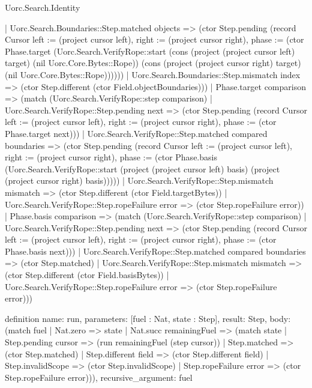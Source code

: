 \begin{lexlean}{Uorc.Search.Identity}
\begin{semanticmodule}
{      | Uorc.Search.Boundaries::Step.matched objects => (ctor Step.pending (record Cursor {left := (project cursor left), right := (project cursor right), phase := (ctor Phase.target (Uorc.Search.VerifyRope::start (cons (project (project cursor left) target) (nil Uorc.Core.Bytes::Rope)) (cons (project (project cursor right) target) (nil Uorc.Core.Bytes::Rope))))}))
      | Uorc.Search.Boundaries::Step.mismatch index => (ctor Step.different (ctor Field.objectBoundaries)))
    | Phase.target comparison => (match (Uorc.Search.VerifyRope::step comparison)
      | Uorc.Search.VerifyRope::Step.pending next => (ctor Step.pending (record Cursor {left := (project cursor left), right := (project cursor right), phase := (ctor Phase.target next)}))
      | Uorc.Search.VerifyRope::Step.matched compared boundaries => (ctor Step.pending (record Cursor {left := (project cursor left), right := (project cursor right), phase := (ctor Phase.basis (Uorc.Search.VerifyRope::start (project (project cursor left) basis) (project (project cursor right) basis)))}))
      | Uorc.Search.VerifyRope::Step.mismatch mismatch => (ctor Step.different (ctor Field.targetBytes))
      | Uorc.Search.VerifyRope::Step.ropeFailure error => (ctor Step.ropeFailure error))
    | Phase.basis comparison => (match (Uorc.Search.VerifyRope::step comparison)
      | Uorc.Search.VerifyRope::Step.pending next => (ctor Step.pending (record Cursor {left := (project cursor left), right := (project cursor right), phase := (ctor Phase.basis next)}))
      | Uorc.Search.VerifyRope::Step.matched compared boundaries => (ctor Step.matched)
      | Uorc.Search.VerifyRope::Step.mismatch mismatch => (ctor Step.different (ctor Field.basisBytes))
      | Uorc.Search.VerifyRope::Step.ropeFailure error => (ctor Step.ropeFailure error)))
}

definition{
  name: run,
  parameters: [fuel : Nat, state : Step],
  result: Step,
  body: (match fuel
    | Nat.zero => state
    | Nat.succ remainingFuel => (match state
      | Step.pending cursor => (run remainingFuel (step cursor))
      | Step.matched => (ctor Step.matched)
      | Step.different field => (ctor Step.different field)
      | Step.invalidScope => (ctor Step.invalidScope)
      | Step.ropeFailure error => (ctor Step.ropeFailure error))),
  recursive_argument: fuel
}


\end{semanticmodule}
\end{lexlean}
